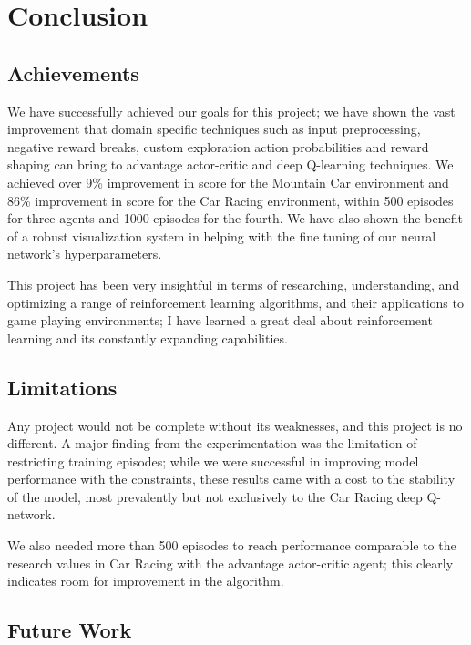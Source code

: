 \chapter{Conclusion}

\section{Achievements}
We have successfully achieved our goals for this project; we have shown the
vast improvement that domain specific techniques such as input preprocessing,
negative reward breaks, custom exploration action probabilities and reward
shaping can bring to advantage actor-critic and deep Q-learning techniques. We
achieved over 9\% improvement in score for the Mountain Car environment and
86\% improvement in score for the Car Racing environment, within 500 episodes
for three agents and 1000 episodes for the fourth. We have also shown the
benefit of a robust visualization system in helping with the fine tuning of our
neural network's hyperparameters.

This project has been very insightful in terms of researching, understanding,
and optimizing a range of reinforcement learning algorithms, and their
applications to game playing environments; I have learned a great deal about
reinforcement learning and its constantly expanding capabilities.

\section{Limitations}

Any project would not be complete without its weaknesses, and this project is
no different. A major finding from the experimentation was the limitation of
restricting training episodes; while we were successful in improving model
performance with the constraints, these results came with a cost to the
stability of the model, most prevalently but not exclusively to the Car Racing
deep Q-network.

We also needed more than 500 episodes to reach performance comparable to the
research values in Car Racing with the advantage actor-critic agent; this
clearly indicates room for improvement in the algorithm.

\newpage

\section{Future Work}

